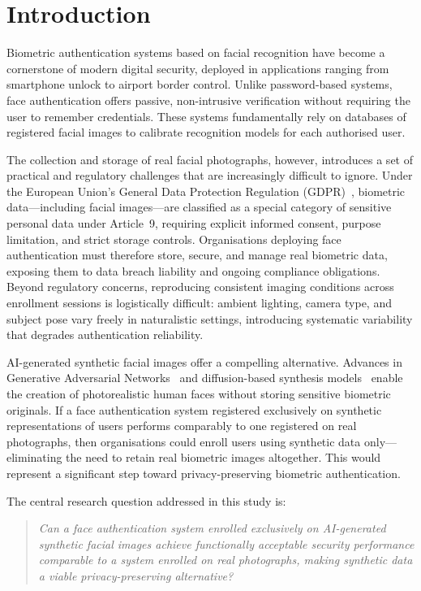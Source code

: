 \documentclass[conference]{IEEEtran}
\begin{document}
\section{Introduction}

Biometric authentication systems based on facial recognition
have become a cornerstone of modern digital security, deployed
in applications ranging from smartphone unlock to airport
border control. Unlike password-based systems, face
authentication offers passive, non-intrusive verification
without requiring the user to remember credentials. These
systems fundamentally rely on databases of registered facial
images to calibrate recognition models for each authorised
user.

The collection and storage of real facial photographs,
however, introduces a set of practical and regulatory
challenges that are increasingly difficult to ignore. Under
the European Union's General Data Protection Regulation
(GDPR)~\cite{gdpr}, biometric data---including facial
images---are classified as a special category of sensitive
personal data under Article~9, requiring explicit informed
consent, purpose limitation, and strict storage controls.
Organisations deploying face authentication must therefore
store, secure, and manage real biometric data, exposing them
to data breach liability and ongoing compliance obligations.
Beyond regulatory concerns, reproducing consistent imaging
conditions across enrollment sessions is logistically
difficult: ambient lighting, camera type, and subject pose
vary freely in naturalistic settings, introducing systematic
variability that degrades authentication reliability.

AI-generated synthetic facial images offer a compelling
alternative. Advances in Generative Adversarial
Networks~\cite{goodfellow2014} and diffusion-based synthesis
models~\cite{rombach2022} enable the creation of
photorealistic human faces without storing sensitive biometric
originals. If a face authentication system registered
exclusively on synthetic representations of users performs
comparably to one registered on real photographs, then
organisations could enroll users using synthetic data
only---eliminating the need to retain real biometric images
altogether. This would represent a significant step toward
privacy-preserving biometric authentication.

The central research question addressed in this study is:

\begin{quote}
  \textit{Can a face authentication system enrolled exclusively
  on AI-generated synthetic facial images achieve functionally
  acceptable security performance comparable to a system
  enrolled on real photographs, making synthetic data a
  viable privacy-preserving alternative?}
\end{quote}
\end{document}
